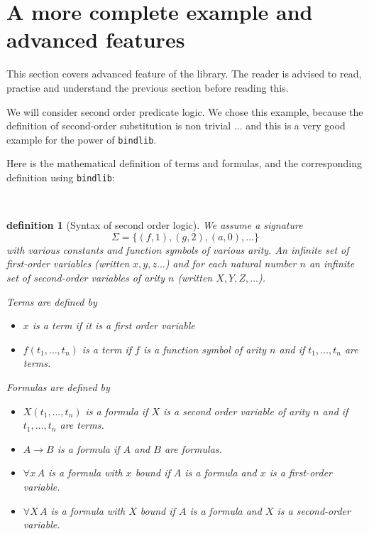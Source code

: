 \documentclass[11pt]{article}
\begin{document}
\section{A more complete example and advanced features}

This section covers advanced feature of the library. The reader is
advised to read, practise and understand the previous section before
reading this.

We will consider second order predicate logic.
We chose this example, because the definition of second-order
substitution is non trivial ... and this is a very good example for
the power of \verb#bindlib#.

Here is the mathematical definition of terms and formulas, and the
corresponding definition using \verb#bindlib#:

\newtheorem{definition}{definition}\
\begin{definition}[Syntax of second order logic]\rm
We assume a signature
$$\Sigma = \{(f,1), (g,2), (a,0), \dots\}$$ with various
constants and function symbols of
various arity. An infinite set of first-order variables (written
$x,y,z\dots$) and for each natural number $n$ an infinite set of
second-order variables of arity $n$ (written $X,Y,Z,\dots$).

Terms are defined by
\begin{itemize}
\item $x$ is a term if it is a first order variable
\item $f(t_1,\dots,t_n)$ is a term if $f$ is a function symbol of
arity $n$ and if $t_1,\dots,t_n$ are terms.
\end{itemize}

Formulas are defined by
\begin{itemize}
\item $X(t_1,\dots,t_n)$ is a formula if $X$ is a second order variable of
arity $n$ and if $t_1,\dots,t_n$ are terms.
\item $A \to B$ is a formula if $A$ and $B$ are formulas.
\item $\forall x\,A$ is a formula with $x$ bound if $A$ is a formula
and $x$ is a first-order variable.
\item $\forall X\,A$ is a formula with $X$ bound if $A$ is a formula
and $X$ is a second-order variable.
\end{itemize}
\end{definition}
\end{document}
